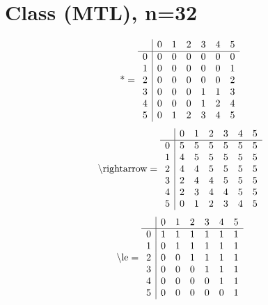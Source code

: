 \documentclass[11pt]{article}
\begin{document}
\section{Class (MTL), n=32}
\[\text{*} = 
\begin{array}{r | r r r r r r}
 & 0 & 1 & 2 & 3 & 4 & 5 \\ \hline
0 & 0 & 0 & 0 & 0 & 0 & 0 \\
1 & 0 & 0 & 0 & 0 & 0 & 1 \\
2 & 0 & 0 & 0 & 0 & 0 & 2 \\
3 & 0 & 0 & 0 & 1 & 1 & 3 \\
4 & 0 & 0 & 0 & 1 & 2 & 4 \\
5 & 0 & 1 & 2 & 3 & 4 & 5 \\
\end{array}
\]
\[\text{\textbackslash rightarrow} = 
\begin{array}{r | r r r r r r}
 & 0 & 1 & 2 & 3 & 4 & 5 \\ \hline
0 & 5 & 5 & 5 & 5 & 5 & 5 \\
1 & 4 & 5 & 5 & 5 & 5 & 5 \\
2 & 4 & 4 & 5 & 5 & 5 & 5 \\
3 & 2 & 4 & 4 & 5 & 5 & 5 \\
4 & 2 & 3 & 4 & 4 & 5 & 5 \\
5 & 0 & 1 & 2 & 3 & 4 & 5 \\
\end{array}
\]
\[\text{\textbackslash le} = 
\begin{array}{r | r r r r r r}
 & 0 & 1 & 2 & 3 & 4 & 5 \\ \hline
0 & 1 & 1 & 1 & 1 & 1 & 1 \\
1 & 0 & 1 & 1 & 1 & 1 & 1 \\
2 & 0 & 0 & 1 & 1 & 1 & 1 \\
3 & 0 & 0 & 0 & 1 & 1 & 1 \\
4 & 0 & 0 & 0 & 0 & 1 & 1 \\
5 & 0 & 0 & 0 & 0 & 0 & 1 \\
\end{array}
\]
\end{document}
